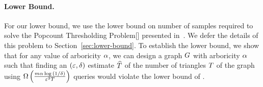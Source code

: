 
\paragraph*{Lower Bound.} For our lower bound, we use the lower bound on number of samples required to solve the Popcount Thresholding Problem[\ptp{}] presented in~\citep{DBLP:conf/approx/AssadiN22}. We defer the details of this problem to Section~\ref{sec:lower-bound}. To establish the lower bound, we show that for any value of arboricity $\alpha$, we can design a graph $G$ with arboricity $\alpha$ such that finding an $\left({\varepsilon,\delta}\right)$ estimate $\widehat{T}$ of the number of triangles $T$ of the graph using $\Omega\left({{\frac{m\alpha\log{\left({1/\delta}\right)}}{\varepsilon^2T}}}\right)$ queries would violate the lower bound of \ptp{}.